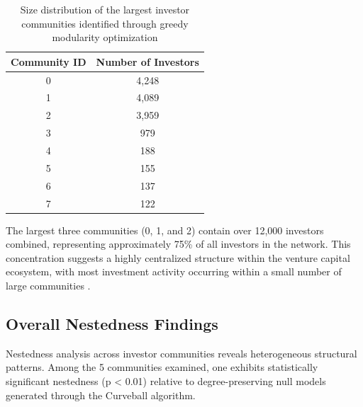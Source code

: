 
\begin{table}[htp]
\centering
\begin{tabular}{|c|c|}
\hline
\textbf{Community ID} & \textbf{Number of Investors} \\
\hline
0 & 4,248 \\
1 & 4,089 \\
2 & 3,959 \\
3 & 979 \\
4 & 188 \\
5 & 155 \\
6 & 137 \\
7 & 122 \\
\hline
\end{tabular}
\caption{Size distribution of the largest investor communities identified through greedy modularity optimization}
\label{tab:community_sizes}
\end{table}

The largest three communities (0, 1, and 2) contain over 12,000 investors combined, representing approximately 75\% of all investors in the network. This concentration suggests a highly centralized structure within the venture capital ecosystem, with most investment activity occurring within a small number of large communities \cite{Borgatti2011}. 




\subsection{Overall Nestedness Findings}

\newcommand{\numCommAnalysedNestedness}{5}

Nestedness analysis across investor communities reveals heterogeneous structural patterns. Among the \numCommAnalysedNestedness{} communities examined, one exhibits statistically significant nestedness (p < 0.01) relative to degree-preserving null models generated through the Curveball algorithm.

